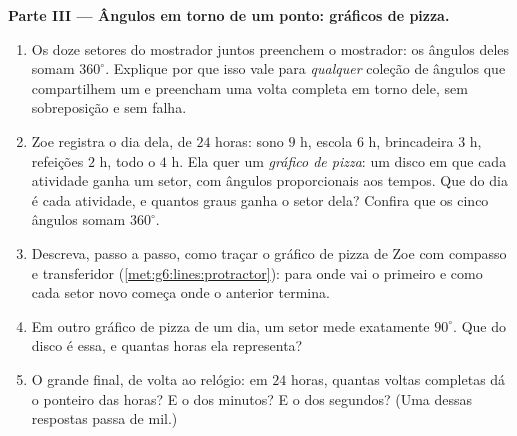 \begin{problem}
\medskip
\noindent\textbf{Parte III --- Ângulos em torno de um ponto: gráficos
de pizza.}
\begin{enumerate}[resume]
  \item Os doze setores do mostrador juntos preenchem o mostrador: os
        ângulos deles somam $360^\circ$. Explique por que isso vale
        para \emph{qualquer} coleção de ângulos que compartilhem um
         e preencham uma volta completa em torno dele, sem
        sobreposição e sem falha.
  \item Zoe registra o dia dela, de $24$ horas: sono $9$ h, escola
        $6$ h, brincadeira $3$ h, refeições $2$ h, todo o  $4$ h.
        Ela quer um \emph{gráfico de pizza}: um disco em que cada
        atividade ganha um setor, com ângulos proporcionais aos tempos.
        Que  do dia é cada atividade, e quantos graus ganha o
        setor dela? Confira que os cinco ângulos somam $360^\circ$.
  \item Descreva, passo a passo, como traçar o gráfico de pizza de Zoe
        com compasso e transferidor
        (\cref{met:g6:lines:protractor}): para onde vai o primeiro
         e como cada setor novo começa onde o anterior termina.
  \item Em outro gráfico de pizza de um dia, um setor mede exatamente
        $90^\circ$. Que  do disco é essa, e quantas horas ela
        representa?
  \item O grande final, de volta ao relógio: em $24$ horas, quantas
        voltas completas dá o ponteiro das horas? E o dos minutos? E o
        dos segundos? (Uma dessas respostas passa de mil.)
\end{enumerate}
\end{problem}
